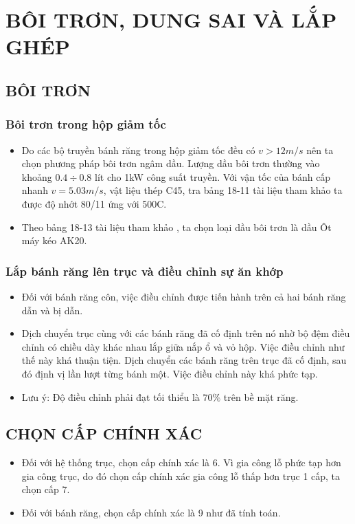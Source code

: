 \chapter{BÔI TRƠN, DUNG SAI VÀ LẮP GHÉP}
    \section{BÔI TRƠN}
        \subsection{Bôi trơn trong hộp giảm tốc}
            \begin{itemize}
                \item Do các bộ truyền bánh răng trong hộp giảm tốc đều có $v > 12 m/s$ nên ta chọn phương pháp bôi trơn ngâm dầu. Lượng dầu bôi trơn thường vào khoảng $0.4 \div 0.8$ lít cho 1kW công suất truyền. Với vận tốc của bánh cấp nhanh $v = 5.03 m/s$, vật liệu thép C45, tra bảng 18-11 tài liệu tham khảo \cite{tltk2} ta được độ nhớt 80/11 ứng với 500C. 
                \item Theo bảng 18-13 tài liệu tham khảo \cite{tltk2}, ta chọn loại dầu bôi trơn là dầu Ôt máy kéo AK20. 
            \end{itemize}
        \subsection{Lắp bánh răng lên trục và điều chỉnh sự ăn khớp}
            \begin{itemize}
                \item Đối với bánh răng côn, việc điều chỉnh được tiến hành trên cả hai bánh răng dẫn và bị dẫn.
                \item Dịch chuyển trục cùng với các bánh răng đã cố định trên nó nhờ bộ đệm điều chỉnh có chiều dày khác nhau lắp giữa nắp ổ và vỏ hộp. Việc điều chỉnh như thế này khá thuận tiện. Dịch chuyển các bánh răng trên trục đã cố định, sau đó định vị lần lượt từng bánh một. Việc điều chỉnh này khá phức tạp.
                \item Lưu ý: Độ điều chỉnh phải đạt tối thiểu là $70\%$ trên bề mặt răng.
            \end{itemize}
    \section{CHỌN CẤP CHÍNH XÁC}
        \begin{itemize}
            \item Đối với hệ thống trục, chọn cấp chính xác là 6. Vì gia công lỗ phức tạp hơn gia công trục, do đó chọn cấp chính xác gia công lỗ thấp hơn trục 1 cấp, ta chọn cấp 7.
            \item Đối với bánh răng, chọn cấp chính xác là 9 như đã tính toán.
        \end{itemize}
